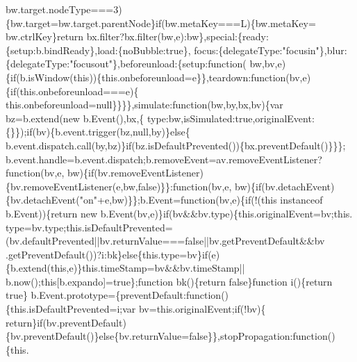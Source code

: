 \begin{DoxyCode}
      bw.target.nodeType===3)\{bw.target=bw.target.parentNode\}\textcolor{keywordflow}{if}(bw.metaKey===L)\{bw.metaKey=
      bw.ctrlKey\}\textcolor{keywordflow}{return} bx.filter?bx.filter(bw,e):bw\},special:\{ready:\{setup:b.bindReady\},load:\{noBubble:\textcolor{keyword}{true}\},
      focus:\{delegateType:\textcolor{stringliteral}{"focusin"}\},blur:\{delegateType:\textcolor{stringliteral}{"focusout"}\},beforeunload:\{setup:\textcolor{keyword}{function}(
      bw,bv,e)\{\textcolor{keywordflow}{if}(b.isWindow(\textcolor{keyword}{this}))\{this.onbeforeunload=e\}\},teardown:\textcolor{keyword}{function}(bv,e)\{\textcolor{keywordflow}{if}(this.onbeforeunload===e)\{
      this.onbeforeunload=null\}\}\}\},simulate:\textcolor{keyword}{function}(bw,by,bx,bv)\{var bz=b.extend(\textcolor{keyword}{new} b.Event(),bx,\{
      type:bw,isSimulated:\textcolor{keyword}{true},originalEvent:\{\}\});\textcolor{keywordflow}{if}(bv)\{b.event.trigger(bz,null,by)\}\textcolor{keywordflow}{else}\{
      b.event.dispatch.call(by,bz)\}\textcolor{keywordflow}{if}(bz.isDefaultPrevented())\{bx.preventDefault()\}\}\};
      b.event.handle=b.event.dispatch;b.removeEvent=av.removeEventListener?\textcolor{keyword}{function}(bv,e,
      bw)\{\textcolor{keywordflow}{if}(bv.removeEventListener)\{bv.removeEventListener(e,bw,\textcolor{keyword}{false})\}\}:\textcolor{keyword}{function}(bv,e,
      bw)\{\textcolor{keywordflow}{if}(bv.detachEvent)\{bv.detachEvent(\textcolor{stringliteral}{"on"}+e,bw)\}\};b.Event=\textcolor{keyword}{function}(bv,e)\{\textcolor{keywordflow}{if}(!(\textcolor{keyword}{this} instanceof 
      b.Event))\{\textcolor{keywordflow}{return} \textcolor{keyword}{new} b.Event(bv,e)\}\textcolor{keywordflow}{if}(bv&&bv.type)\{this.originalEvent=bv;this.
      type=bv.type;this.isDefaultPrevented=(bv.defaultPrevented||bv.returnValue===\textcolor{keyword}{false}||bv.getPreventDefault&&bv
      .getPreventDefault())?i:bk\}\textcolor{keywordflow}{else}\{this.type=bv\}\textcolor{keywordflow}{if}(e)\{b.extend(\textcolor{keyword}{this},e)\}this.timeStamp=bv&&bv.timeStamp||
      b.now();\textcolor{keyword}{this}[b.expando]=\textcolor{keyword}{true}\};\textcolor{keyword}{function} bk()\{\textcolor{keywordflow}{return} \textcolor{keyword}{false}\}\textcolor{keyword}{function} i()\{\textcolor{keywordflow}{return} \textcolor{keyword}{true}\}
      b.Event.prototype=\{preventDefault:\textcolor{keyword}{function}()\{this.isDefaultPrevented=i;var bv=this.originalEvent;\textcolor{keywordflow}{if}(!bv)\{\textcolor{keywordflow}{
      return}\}\textcolor{keywordflow}{if}(bv.preventDefault)\{bv.preventDefault()\}\textcolor{keywordflow}{else}\{bv.returnValue=\textcolor{keyword}{false}\}\},stopPropagation:\textcolor{keyword}{function}()\{this.

\end{DoxyCode}
